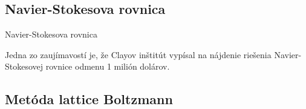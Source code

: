 \documentclass[]{tukediphc}
\begin{document}


\subsection{Navier-Stokesova rovnica}

Navier-Stokesova rovnica

Jedna zo zaujímavostí je, že Clayov inštitút vypísal na nájdenie riešenia Navier-Stokesovej rovnice odmenu 1 milión dolárov. 

\subsection{Metóda lattice Boltzmann}
\end{document}
